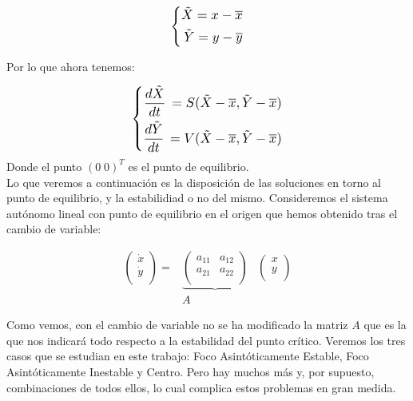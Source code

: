 \documentclass[12pt,a4paper]{report} %
\begin{document}
	\begin{equation}
		\label{eq:trans}
		\scalebox{1.2}{$\displaystyle
			\left\{
			\begin{aligned}
				\tilde{X}=x-\overline{x} \\
				\tilde{Y}=y-\overline{y}
			\end{aligned}
			\right.
			$}
	\end{equation}\smallskip
	
	\vspace{0.5cm}\noindent Por lo que ahora tenemos:
	
	\begin{equation}
		\label{eq:trans2}
		\scalebox{1.2}{$\displaystyle
			\left\{
			\begin{aligned}
				\frac{d\tilde{X}}{dt}\,=S(\tilde{X}-\overline{x},\tilde{Y}-\overline{x}) \\
				\frac{d\tilde{Y}}{dt}\,=V(\tilde{X}-\overline{x},\tilde{Y}-\overline{x})
			\end{aligned}
			\right.
			$}
	\end{equation}\smallskip
	Donde el punto  $(0\; 0)^T$ es el punto de equilibrio. \\[0.5cm]
	
	Lo que veremos a continuación es la disposición de las soluciones en torno al punto de equilibrio, y la estabilidiad o no del mismo. Consideremos el sistema autónomo lineal con punto de equilibrio en el origen que hemos obtenido tras el cambio de variable:
	
	\begin{eqnarray}
		\label{eq:trans3}
			\begin{pmatrix}
				\dot{x}\\
				\dot{y}\\
			\end{pmatrix} =
			&\underbrace{\begin{pmatrix}
				a_{11} & a_{12}\\
				a_{21} & a_{22}\\
			\end{pmatrix}}&
			\begin{pmatrix}
				x\\
				y\\
			\end{pmatrix} \nonumber \\[1mm]
			&A&
	\end{eqnarray} \smallskip
	
	\noindent Como vemos, con el cambio de variable no se ha modificado la matriz $A$ que es la que nos indicará todo respecto a la estabilidad del punto crítico. Veremos los tres casos que se estudian en este trabajo: Foco Asintóticamente Estable, Foco Asintóticamente Inestable y Centro. Pero hay muchos más y, por supuesto, combinaciones de todos ellos, lo cual complica estos problemas en gran medida.
	
\end{document}
